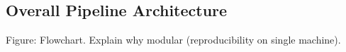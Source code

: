 \subsection{Overall Pipeline Architecture}
\label{sec:architecture}

Figure: Flowchart. Explain why modular (reproducibility on single machine).